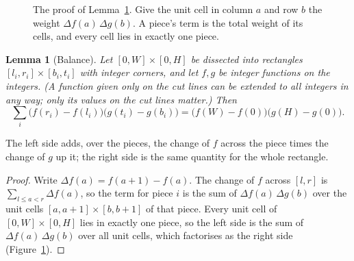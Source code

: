 \documentclass[11pt]{amsart}
\newtheorem{lem}[thm]{Lemma}
\theoremstyle{definition}
\begin{document}
\begin{figure}[ht]
\centering
{}
\caption{The proof of Lemma~\ref{lem:balance}. Give the unit cell in column $a$ and row $b$ the
weight $\Delta f(a)\,\Delta g(b)$. A piece's term is the total weight of its cells, and every cell lies in
exactly one piece.}
\label{fig:balance}
\end{figure}

\begin{lem}[Balance]\label{lem:balance}
Let $[0,W]\times[0,H]$ be dissected into rectangles $[l_i,r_i]\times[b_i,t_i]$ with integer
corners, and let $f,g$ be integer functions on the integers. (A function given only on the cut
lines can be extended to all integers in any way; only its values on the cut lines matter.) Then
\[
\sum_i\bigl(f(r_i)-f(l_i)\bigr)\bigl(g(t_i)-g(b_i)\bigr)=\bigl(f(W)-f(0)\bigr)\bigl(g(H)-g(0)\bigr).
\]
\end{lem}

\noindent
The left side adds, over the pieces, the change of $f$ across the piece times the change of $g$ up
it; the right side is the same quantity for the whole rectangle.

\begin{proof}
Write $\Delta f(a)=f(a+1)-f(a)$. The change of $f$ across $[l,r]$ is $\sum_{l\le a<r}\Delta f(a)$, so
the term for piece $i$ is the sum of $\Delta f(a)\,\Delta g(b)$ over the unit cells
$[a,a+1]\times[b,b+1]$ of that piece. Every unit cell of $[0,W]\times[0,H]$ lies in exactly one piece,
so the left side is the sum of $\Delta f(a)\,\Delta g(b)$ over all unit cells, which factorises as the
right side (Figure~\ref{fig:balance}).
\end{proof}
\end{document}
